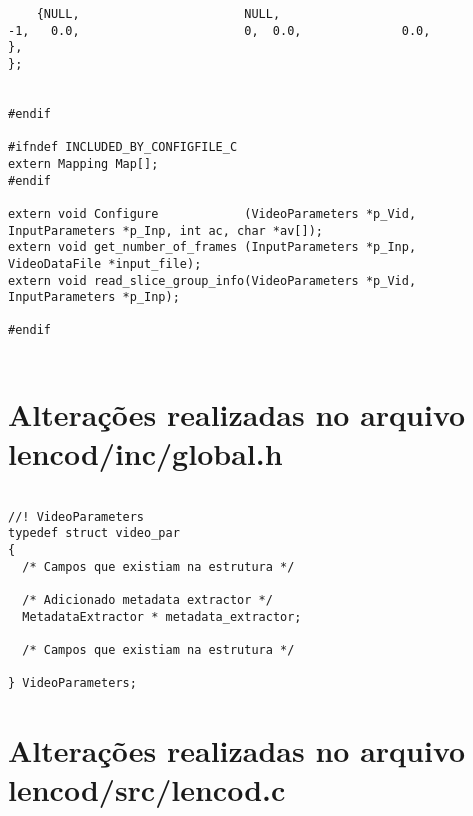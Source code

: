 \begin{lstlisting}
    {NULL,                       NULL,                                   -1,   0.0,                       0,  0.0,              0.0,                             },
};


#endif

#ifndef INCLUDED_BY_CONFIGFILE_C
extern Mapping Map[];
#endif

extern void Configure            (VideoParameters *p_Vid, InputParameters *p_Inp, int ac, char *av[]);
extern void get_number_of_frames (InputParameters *p_Inp, VideoDataFile *input_file);
extern void read_slice_group_info(VideoParameters *p_Vid, InputParameters *p_Inp);

#endif


\end{lstlisting}


\section{Alterações realizadas no arquivo lencod/inc/global.h}

\begin{lstlisting}

//! VideoParameters
typedef struct video_par
{
  /* Campos que existiam na estrutura */

  /* Adicionado metadata extractor */
  MetadataExtractor * metadata_extractor;

  /* Campos que existiam na estrutura */

} VideoParameters;

\end{lstlisting}


\section{Alterações realizadas no arquivo lencod/src/lencod.c}

